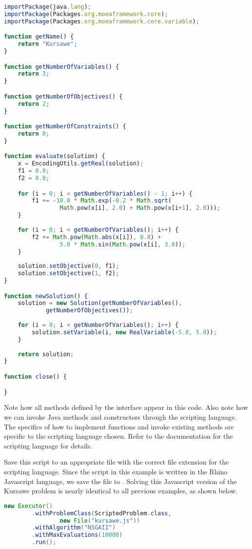 \begin{lstlisting}[language=JavaScript]
importPackage(java.lang);
importPackage(Packages.org.moeaframework.core);
importPackage(Packages.org.moeaframework.core.variable);

function getName() {
	return "Kursawe";
}

function getNumberOfVariables() {
	return 3;
}

function getNumberOfObjectives() {
	return 2;
}

function getNumberOfConstraints() {
	return 0;
}

function evaluate(solution) {
	x = EncodingUtils.getReal(solution);
	f1 = 0.0;
	f2 = 0.0;

	for (i = 0; i < getNumberOfVariables() - 1; i++) {
		f1 += -10.0 * Math.exp(-0.2 * Math.sqrt(
				Math.pow(x[i], 2.0) + Math.pow(x[i+1], 2.0)));
	}
 
	for (i = 0; i < getNumberOfVariables(); i++) {
		f2 += Math.pow(Math.abs(x[i]), 0.8) +  
				5.0 * Math.sin(Math.pow(x[i], 3.0));
	}
 
	solution.setObjective(0, f1);
	solution.setObjective(1, f2);
}

function newSolution() {
	solution = new Solution(getNumberOfVariables(), 
			getNumberOfObjectives());
 
	for (i = 0; i < getNumberOfVariables(); i++) {
		solution.setVariable(i, new RealVariable(-5.0, 5.0));
	}
 
	return solution;
}

function close() {

}
\end{lstlisting}

Note how all methods defined by the  interface appear in this code.  Also note how we can invoke Java methods and constructors through the scripting language.  The specifics of how to implement functions and invoke existing methods are specific to the scripting language chosen.  Refer to the documentation for the scripting language for details.

Save this script to an appropriate file with the correct file extension for the scripting language.  Since the script in this example is written in the Rhino Javascript language, we save the file to .  Solving this Javascript version of the Kursawe problem is nearly identical to all previous examples, as shown below.

\begin{lstlisting}[language=Java]
new Executor()
		.withProblemClass(ScriptedProblem.class, 
				new File("kursawe.js"))
		.withAlgorithm("NSGAII")
		.withMaxEvaluations(10000)
		.run();
\end{lstlisting}

